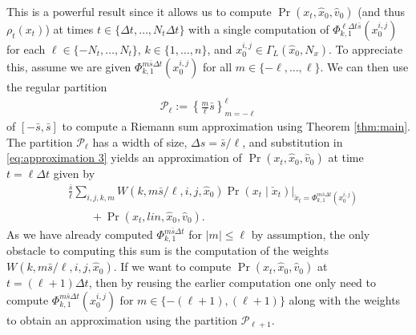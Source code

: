 \documentclass[letterpaper,10pt,conference]{ieeetran}
\begin{document}
This is a powerful result since it allows us to compute $\Pr( x_t, \hat{x}_0, \hat{v}_0)$  (and thus $\rho_t(x_t)$) at times $t \in \{\Delta t, \dots, N_t \Delta t\}$ with a single computation of $\Phi_{k,1}^{\ell \Delta t \bar{s}}( x_0^{i,j})$ for each $\ell \in  \{-N_t,\dots,N_t\}$, $k \in \{1,\dots,n\}$, and $x_0^{i,j} \in \Gamma_L( \hat{x}_0 , N_x)$.
To appreciate this, assume we are given $\Phi_{k,1}^{m  \bar{s} \Delta t}(x_0^{i,j})$ for all $m \in \{ -\ell, \ldots, \ell \}$.
We can then use the regular partition
\begin{align}
	\mathcal{P}_\ell := \left\{ \frac{m}{\ell} \bar{s} \right\}_{m=-\ell}^{\ell} \label{eq:partition}
\end{align}
of $[-\bar{s}, \bar{s}]$ to compute a Riemann sum approximation using Theorem \ref{thm:main}.
The partition $\mathcal{P}_\ell$ has a width of size, $\Delta s = \bar{s} / \ell$, and substitution in \eqref{eq:approximation 3} yields an approximation of $\Pr( x_t, \hat{x}_0, \hat{v}_0)$ at time $t=\ell \Delta t$
given by
\begin{align}
		&\frac{\bar{s}}{\ell} \sum_{i,j,k,m} W(k,m \bar{s} / \ell ,i,j,\hat{x}_0) \left. \Pr( x_t \mid \check{x}_t ) \right|_{ \check{x}_t = \Phi_{k,1}^{m \bar{s} \Delta t}( x_0^{i,j}) }  \nonumber \\
		&\qquad+\Pr( x_t , lin, \hat{x}_0, \hat{v}_0 ).
\end{align}
As we have already computed $\Phi_{k,1}^{m \bar{s} \Delta t}$ for $| m | \leq \ell$ by assumption, the only obstacle to computing this sum is the computation of the weights $W(k,m \bar{s} / \ell ,i,j,\hat{x}_0)$.
If we want to compute $\Pr( x_t, \hat{x}_0, \hat{v}_0)$ at $t=(\ell + 1 ) \Delta t$, then by reusing the earlier computation one only need to compute $\Phi_{k,1}^{m  \bar{s} \Delta t}(x_0^{i,j})$ for $m \in \{ -( \ell + 1 ), (\ell + 1 )\}$ along with the weights to obtain an approximation using the partition $\mathcal{P}_{\ell + 1}$.


\end{document}
